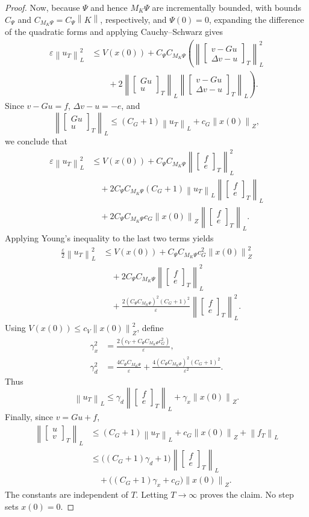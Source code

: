 \documentclass[10pt,twocolumn,letterpaper]{article}
\theoremstyle{definition}
\theoremstyle{plain}
\newcommand{\col}[1]{\begin{bmatrix}#1\end{bmatrix}}
\newcommand{\norm}[1]{\left\lVert #1\right\rVert}
\begin{document}
\begin{proof}
Now, because $\Psi$ and hence $M_K\Psi$ are incrementally bounded,
with bounds $C_\Psi$ and
$C_{M_K\Psi}=C_\Psi\norm{K}$, respectively, and
$\Psi(0)=0$, expanding the difference of the quadratic forms and
applying Cauchy--Schwarz gives
\begin{align*}
 \varepsilon\norm{u_T}_L^2
 &\leq V(x(0))+C_\Psi C_{M_K\Psi}
 \left(\norm{\col{v-Gu\\\Delta v-u}_T}_L^2\right.\\
 &\left.\qquad
 +2\norm{\col{Gu\\u}_T}_L
      \norm{\col{v-Gu\\\Delta v-u}_T}_L\right).
\end{align*}
Since $v-Gu=f$, $\Delta v-u=-e$, and
\[
 \norm{\col{Gu\\u}_T}_L
 \leq (C_G+1)\norm{u_T}_L+c_G\norm{x(0)}_Z,
\]
we conclude that
\begin{align*}
 \varepsilon\norm{u_T}_L^2
 &\leq V(x(0))
 +C_\Psi C_{M_K\Psi}\norm{\col{f\\e}_T}_L^2\\
 &\quad+2C_\Psi C_{M_K\Psi}(C_G+1)
       \norm{u_T}_L\norm{\col{f\\e}_T}_L\\
 &\quad+2C_\Psi C_{M_K\Psi}c_G\norm{x(0)}_Z
                         \norm{\col{f\\e}_T}_L.
\end{align*}
Applying Young's inequality to the last two terms yields
\begin{align*}
 \frac{\varepsilon}{2}\norm{u_T}_L^2
 &\leq V(x(0))
      +C_\Psi C_{M_K\Psi}c_G^2\norm{x(0)}_Z^2\\
 &\quad+2C_\Psi C_{M_K\Psi}\norm{\col{f\\e}_T}_L^2\\
 &\quad+\frac{2(C_\Psi C_{M_K\Psi})^2(C_G+1)^2}{\varepsilon}
                  \norm{\col{f\\e}_T}_L^2.
\end{align*}
Using $V(x(0))\leq c_V\norm{x(0)}_Z^2$, define
\begin{align*}
 \gamma_x^2&=\frac{2(c_V+C_\Psi C_{M_K\Psi}c_G^2)}
                  {\varepsilon},\\
 \gamma_d^2&=\frac{4C_\Psi C_{M_K\Psi}}{\varepsilon}
 +\frac{4(C_\Psi C_{M_K\Psi})^2(C_G+1)^2}{\varepsilon^2}.
\end{align*}
Thus
\[
 \norm{u_T}_L\leq
 \gamma_d\norm{\col{f\\e}_T}_L+\gamma_x\norm{x(0)}_Z.
\]
Finally, since $v=Gu+f$,
\begin{align*}
 \norm{\col{u\\v}_T}_L
 &\leq (C_G+1)\norm{u_T}_L+
                 c_G\norm{x(0)}_Z+\norm{f_T}_L\\
 &\leq \bigl((C_G+1)\gamma_d+1\bigr)
                         \norm{\col{f\\e}_T}_L\\
 &\quad+\bigl((C_G+1)\gamma_x+c_G\bigr)\norm{x(0)}_Z.
\end{align*}
The constants are independent of $T$. Letting $T\to\infty$ proves the
claim. No step sets $x(0)=0$.
\end{proof}
\end{document}
